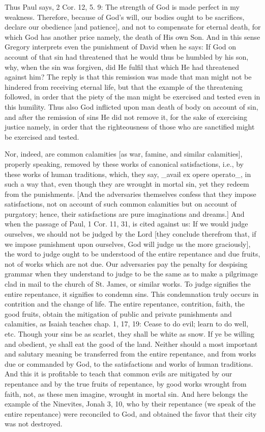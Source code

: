 Thus Paul says, 2 Cor. 12, 5. 9: The strength of God is made perfect
in my weakness.  Therefore, because of God's will, our bodies ought
to be sacrifices, declare our obedience [and patience], and not to
compensate for eternal death, for which God has another price namely,
the death of His own Son.  And in this sense Gregory interprets even
the punishment of David when he says: If God on account of that sin
had threatened that he would thus be humbled by his son, why, when
the sin was forgiven, did He fulfil that which He had threatened
against him?  The reply is that this remission was made that man
might not be hindered from receiving eternal life, but that the
example of the threatening followed, in order that the piety of the
man might be exercised and tested even in this humility.  Thus also
God inflicted upon man death of body on account of sin, and after the
remission of sins He did not remove it, for the sake of exercising
justice namely, in order that the righteousness of those who are
sanctified might be exercised and tested.

Nor, indeed, are common calamities [as war, famine, and similar
calamities], properly speaking, removed by these works of canonical
satisfactions, i.e., by these works of human traditions, which, they
say, _avail ex opere operato_, in such a way that, even though they
are wrought in mortal sin, yet they redeem from the punishments.
[And the adversaries themselves confess that they impose
satisfactions, not on account of such common calamities but on
account of purgatory; hence, their satisfactions are pure
imaginations and dreams.] And when the passage of Paul, 1 Cor. 11, 31,
is cited against us: If we would judge ourselves, we should not be
judged by the Lord [they conclude therefrom that, if we impose
punishment upon ourselves, God will judge us the more graciously],
the word to judge ought to be understood of the entire repentance and
due fruits, not of works which are not due.  Our adversaries pay the
penalty for despising grammar when they understand to judge to be the
same as to make a pilgrimage clad in mail to the church of St. James,
or similar works.  To judge signifies the entire repentance, it
signifies to condemn sins.  This condemnation truly occurs in
contrition and the change of life.  The entire repentance, contrition,
faith, the good fruits, obtain the mitigation of public and private
punishments and calamities, as Isaiah teaches chap. 1, 17, 19: Cease
to do evil; learn to do well, etc. Though your sins be as scarlet,
they shall be white as snow.  If ye be willing and obedient, ye shall
eat the good of the land.  Neither should a most important and
salutary meaning be transferred from the entire repentance, and from
works due or commanded by God, to the satisfactions and works of
human traditions.  And this it is profitable to teach that common
evils are mitigated by our repentance and by the true fruits of
repentance, by good works wrought from faith, not, as these men
imagine, wrought in mortal sin.  And here belongs the example of the
Ninevites, Jonah 3, 10, who by their repentance (we speak of the
entire repentance) were reconciled to God, and obtained the favor
that their city was not destroyed.

